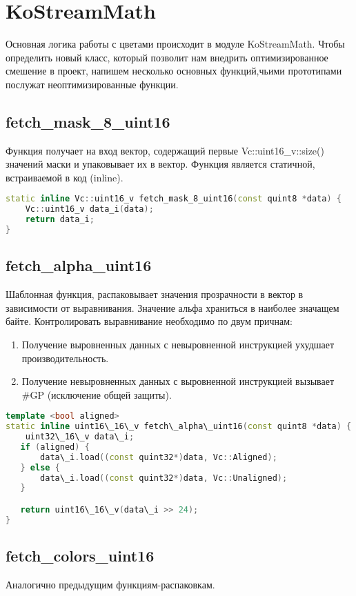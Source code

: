 \section{KoStreamMath}
Основная логика работы с цветами происходит в модуле KoStreamMath. Чтобы определить новый класс, который позволит нам внедрить оптимизированное смешение в проект, напишем несколько основных функций,чьими прототипами послужат неоптимизированные функции.

\subsection{fetch\_mask\_8\_uint16}
Функция получает на вход вектор, содержащий первые Vc::uint16\_v::size() значений маски и упаковывает их в вектор. Функция является статичной, встраиваемой в код (inline).

\begin{lstlisting}[language=c++]
static inline Vc::uint16_v fetch_mask_8_uint16(const quint8 *data) {
    Vc::uint16_v data_i(data);
    return data_i;
}
\end{lstlisting}

\subsection{fetch\_alpha\_uint16}
Шаблонная функция, распаковывает значения прозрачности в вектор в зависимости от выравнивания. Значение альфа храниться в наиболее значащем байте. Контролировать выравнивание необходимо по двум причнам:
\begin{enumerate}
\item Получение выровненных данных с невыровненной инструкцией ухудшает производительность.  
\item Получение невыровненных данных с выровненной инструкцией вызывает \#GP (исключение общей защиты).
\end{enumerate}

\begin{lstlisting}[language=c++]
template <bool aligned>
static inline uint16\_16\_v fetch\_alpha\_uint16(const quint8 *data) {
    uint32\_16\_v data\_i;
   if (aligned) {
       data\_i.load((const quint32*)data, Vc::Aligned);
   } else {
       data\_i.load((const quint32*)data, Vc::Unaligned);
   }

   return uint16\_16\_v(data\_i >> 24);
}
\end{lstlisting}

\subsection{fetch\_colors\_uint16}
Аналогично предыдущим функциям-распаковкам.

